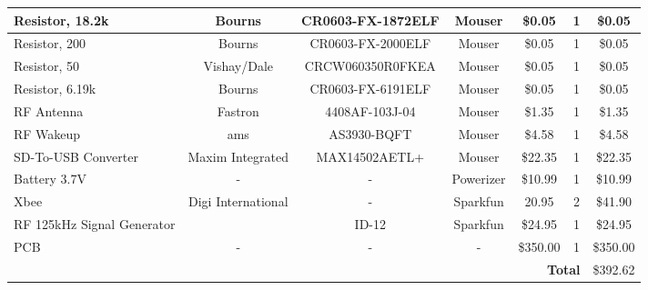 \begin{landscape}
{\begin{center}
\begin{longtable}{|p{1.5in}|c|c|c|c|c|c|}
    Resistor, 18.2k & Bourns & CR0603-FX-1872ELF & Mouser & \$0.05 & 1     & \$0.05 \\ \hline
    Resistor, 200 & Bourns & CR0603-FX-2000ELF & Mouser & \$0.05 & 1     & \$0.05 \\ \hline
    Resistor, 50 & Vishay/Dale & CRCW060350R0FKEA & Mouser & \$0.05 & 1     & \$0.05 \\ \hline
    Resistor, 6.19k & Bourns & CR0603-FX-6191ELF & Mouser & \$0.05 & 1     & \$0.05 \\ \hline
    RF Antenna & Fastron & 4408AF-103J-04 & Mouser & \$1.35 & 1     & \$1.35 \\ \hline
    RF Wakeup & ams   & AS3930-BQFT & Mouser & \$4.58 & 1     & \$4.58 \\ \hline
    SD-To-USB Converter & Maxim Integrated & MAX14502AETL+ & Mouser & \$22.35 & 1     & \$22.35 \\ \hline
    Battery 3.7V & -     & -     & Powerizer & \$10.99 & 1     & \$10.99 \\ \hline
    Xbee  & Digi International & -     & Sparkfun & 20.95 & 2     & \$41.90 \\ \hline
    RF 125kHz Signal Generator &       & ID-12 & Sparkfun & \$24.95 & 1     & \$24.95 \\ \hline
    PCB   & -     & -     & -     & \$350.00 & 1     & \$350.00 \\ \hline
    \multicolumn{6}{|r|}{\textbf{Total}}            & \$392.62  \\ \hline
    
    
\end{longtable}%
\end{center}
}
 \end{landscape}

